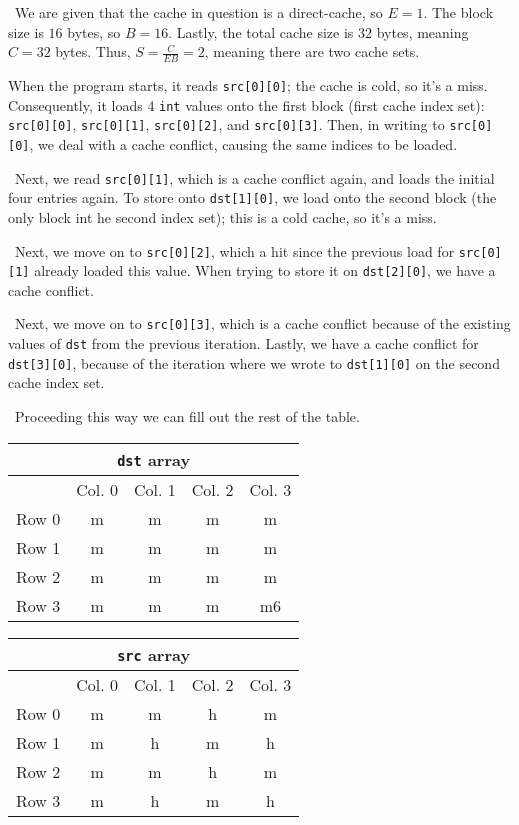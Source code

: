 \documentclass[12pt]{article}
\newenvironment{sol}[1][Solution]{\begin{trivlist}
		\item[\hskip \labelsep {\bfseries #1:}]}{\end{trivlist}}
\begin{document}
\begin{sol}
	\
	We are given that the cache in question is a direct-cache, so $E=1$. The block size is $16$ bytes,
	so $B=16$. Lastly, the total cache size is $32$ bytes, meaning $C=32$ bytes. Thus, $S=\frac{C}{EB}=2$,
	meaning there are two cache sets.
	
	When the program starts, it reads \texttt{src[0][0]}; the cache is cold, so it's a miss. Consequently,
	it loads 4 \texttt{int} values onto the first block (first cache index set): \texttt{src[0][0]},
	\texttt{src[0][1]}, \texttt{src[0][2]}, and \texttt{src[0][3]}. Then, in writing to \texttt{src[0][0]},
	we deal with a cache conflict, causing the same indices to be loaded.
	
	\
	Next, we read \texttt{src[0][1]}, which is a cache conflict again, and loads the initial four entries
	again. To store onto \texttt{dst[1][0]}, we load onto the second block (the only block int he second
	index set); this is a cold cache, so it's a miss.
	
	\
	Next, we move on to \texttt{src[0][2]}, which a hit since the previous load for \texttt{src[0][1]} already
	loaded this value. When trying to store it on \texttt{dst[2][0]}, we have a cache conflict.
	
	\
	Next, we move on to \texttt{src[0][3]}, which is a cache conflict because of the existing values
	of \texttt{dst} from the previous iteration. Lastly, we have a cache conflict for \texttt{dst[3][0]},
	because of the iteration where we wrote to \texttt{dst[1][0]} on the second cache index set.
	
	\
	Proceeding this way we can fill out the rest of the table.
	\begin{center}
		\begin{tabular}{ccccc}
			\multicolumn{5}{c}{\texttt{dst} array} \\
			\hline
			{} & Col. 0 & Col. 1 & {} Col. 2 & {} Col. 3\\
			\hline
			Row 0 & m & m & m & m\\
			Row 1 & m & m & m & m\\
			Row 2 & m & m & m & m\\
			Row 3 & m & m & m & m6\\
		\end{tabular}
	\end{center}
	\begin{center}
		\begin{tabular}{ccccc}
			\multicolumn{5}{c}{\texttt{src} array} \\
			\hline
			{} & Col. 0 & Col. 1 & {} Col. 2 & {} Col. 3\\
			\hline
			Row 0 & m & m & h & m\\
			Row 1 & m & h & m & h\\
			Row 2 & m & m & h & m\\
			Row 3 & m & h & m & h\\
		\end{tabular}
	\end{center}
\end{sol}
\end{document}
